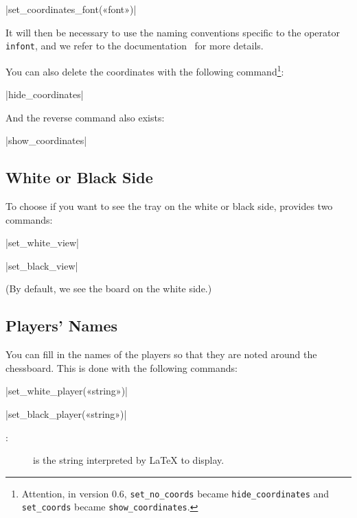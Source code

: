 \documentclass[english]{ltxdoc}
\begin{document}
\commande|set_coordinates_font(«font»)|\smallskip

It will then be necessary to use the naming conventions specific to the \MP{}
operator
\lstinline+infont+, and we refer to the
\MP documentation~\cite{ctan-metapost} for more details.

You can also delete the coordinates with the following command\footnote{Attention,
in version 0.6, \lstinline+set_no_coords+ became
\lstinline+hide_coordinates+ and \lstinline+set_coords+ became
\lstinline+show_coordinates+.}:

\commande|hide_coordinates|\smallskip

And the reverse command also exists:

\commande|show_coordinates|\smallskip


\subsection{White or Black Side}

To choose if you want to see the tray on the white or black side, \mpchess
provides two commands:

\commande|set_white_view|\smallskip

\commande|set_black_view|\smallskip

(By default, we see the board on the white side.)

\subsection{Players' Names}

You can fill in the names of the players so that they are noted around the
chessboard. This is done with the following commands: 

\commande|set_white_player(«string»)|\smallskip

\commande|set_black_player(«string»)|\smallskip

\begin{description}
  \item[ :] is the string interpreted by \LaTeX{} to display.
\end{description}
\end{document}
